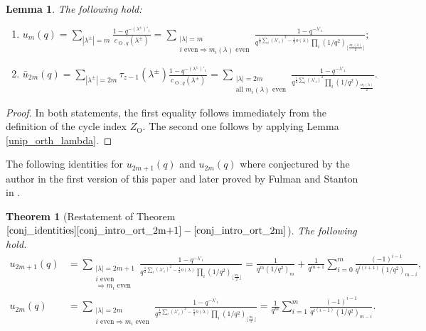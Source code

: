 \documentclass[a4paper, 12pt, oneside]{amsart}
\newtheorem*{thm*}{Theorem}
\newtheorem{lemma}[prop]{Lemma}
\theoremstyle{definition}
\DeclareMathOperator{\Or}{O}
\begin{document}
\begin{lemma}
\label{u_m(q)_ort}
The following hold:
\begin{enumerate}[label=\roman*.]
    \item 
$\displaystyle u_m(q)=\sum_{|\lambda^{\pm}|=m}\frac{1-q^{-(\lambda^{\pm})'_1}}{c_{\Or,q}(\lambda^{\pm})}=\sum_{\substack{|\lambda|=m\\i \text{ even}\Rightarrow m_i(\lambda) \text{ even}}}\frac{1-q^{-\lambda'_1}}{q^{\frac{1}{2}\sum_i (\lambda'_i)^2-\frac{1}{2}o(\lambda)}\prod_i(1/q^2)_{\lfloor\frac{m_i(\lambda)}{2}\rfloor}};$
\item 
$\displaystyle
\bar{u}_{2m}(q)=\sum_{|\lambda^{\pm}|={2m}}\tau_{z-1}(\lambda^{\pm})\frac{1-q^{-(\lambda^{\pm})'_1}}{c_{\Or,q}(\lambda^{\pm})}=\sum_{\substack{|\lambda|=2m\\ \text{all }m_i(\lambda) \text{ even}}}\frac{1-q^{-\lambda'_1}}{q^{\frac{1}{2}\sum_i (\lambda'_i)^2}\prod_i(1/q^2)_{\frac{m_i(\lambda)}{2}}}.$
\end{enumerate}
\end{lemma}
\begin{proof}
In both statements, the first equality follows immediately from the definition of the cycle index $Z_{\Or}$. The second one follows by applying Lemma \ref{unip_orth_lambda}.
\end{proof}


The following identities for $u_{2m+1}(q)$ and ${u}_{2m}(q)$ where conjectured by the author in the first version of this paper and later proved by Fulman and Stanton in \cite{FulmanStanton25}.
\begin{thm*}[Restatement of Theorem $\ref{conj_identities}\eqref{conj_intro_ort_2m+1}-\eqref{conj_intro_ort_2m}$]
The following hold.
\begin{align*}
u_{2m+1}(q)&=\sum_{\substack{|\lambda|=2m+1\\i \text{ even} \\ \Rightarrow m_i \text{ even}}}\frac{1-q^{-\lambda'_1}}{q^{\frac{1}{2}\sum_i (\lambda'_i)^2-\frac{1}{2}o(\lambda)}\prod_i(1/q^2)_{\lfloor\frac{m_i}{2}\rfloor}}=\frac{1}{q^m(1/q^2)_{m}}+\frac{1}{q^{m+1}}\sum_{i=0}^{m}\frac{(-1)^{i-1}}{q^{i(i+1)}(1/q^2)_{m-i}},\\
u_{2m}(q)&=\sum_{\substack{|\lambda|=2m\\i \text{ even}\Rightarrow m_i \text{ even}}}\frac{1-q^{-\lambda'_1}}{q^{\frac{1}{2}\sum_i (\lambda'_i)^2-\frac{1}{2}o(\lambda)}\prod_i(1/q^2)_{\lfloor\frac{m_i}{2}\rfloor}}
=\frac{1}{q^m}\sum_{i=1}^{m}\frac{(-1)^{i-1}}{q^{i(i-1)}(1/q^2)_{m-i}}.
\end{align*}
\end{thm*}
\end{document}

